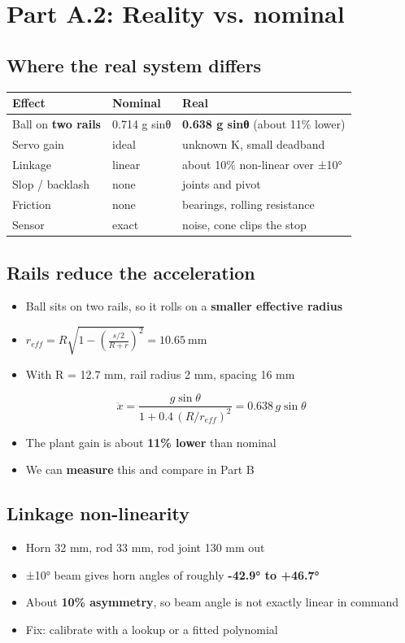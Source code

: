 \documentclass[11pt]{article}
\begin{document}
\section*{Part A.2: Reality vs. nominal}
\label{sec:org22da357}
\subsection*{Where the real system differs}
\label{sec:org90d32e1}
\begin{center}
\begin{tabular}{lll}
Effect & Nominal & Real\\
\hline
Ball on \textbf{two rails} & 0.714 g sinθ & \textbf{0.638 g sinθ} (about 11\% lower)\\
Servo gain & ideal & unknown K, small deadband\\
Linkage & linear & about 10\% non-linear over ±10°\\
Slop / backlash & none & joints and pivot\\
Friction & none & bearings, rolling resistance\\
Sensor & exact & noise, cone clips the stop\\
\end{tabular}
\end{center}
\subsection*{Rails reduce the acceleration}
\label{sec:org05b51ef}
\begin{itemize}
\item Ball sits on two rails, so it rolls on a \textbf{smaller effective radius}
\item \(r_{eff} = R\sqrt{1 - \left(\frac{s/2}{R + r}\right)^2} = 10.65\ \text{mm}\)
\item With R = 12.7 mm, rail radius 2 mm, spacing 16 mm
\end{itemize}

\[ \ddot{x} = \frac{g\sin\theta}{1 + 0.4\,(R/r_{eff})^2} = 0.638\, g\sin\theta \]

\begin{itemize}
\item The plant gain is about \textbf{11\% lower} than nominal
\item We can \textbf{measure} this and compare in Part B
\end{itemize}
\subsection*{Linkage non-linearity}
\label{sec:orge9bd95a}
\begin{itemize}
\item Horn 32 mm, rod 33 mm, rod joint 130 mm out
\item ±10° beam gives horn angles of roughly \textbf{-42.9° to +46.7°}
\item About \textbf{10\% asymmetry}, so beam angle is not exactly linear in command
\item Fix: calibrate with a lookup or a fitted polynomial
\end{itemize}
\end{document}
